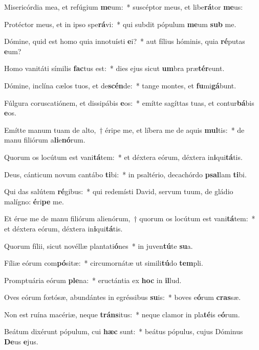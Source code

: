 \item Misericórdia mea, et refúgium \textbf{me}um:~* suscéptor meus, et libe\textbf{rá}tor \textbf{me}us:
\item Protéctor meus, et in ipso spe\textbf{rá}vi:~* qui subdit pópulum \textbf{me}um \textbf{sub} me.
\item Dómine, quid est homo quia innotuísti \textbf{e}i?~* aut fílius hóminis, quia \textbf{ré}putas \textbf{e}um?
\item Homo vanitáti símilis \textbf{fac}tus est:~* dies ejus sicut \textbf{um}bra præ\textbf{tér}eunt.
\item Dómine, inclína cælos tuos, et de\textbf{scén}de:~* tange montes, et \textbf{fu}mi\textbf{gá}bunt.
\item Fúlgura coruscatiónem, et dissipábis \textbf{e}os:~* emítte sagíttas tuas, et contur\textbf{bá}bis \textbf{e}os.
\item Emítte manum tuam de alto,~† éripe me, et líbera me de aquis \textbf{mul}tis:~* de manu filiórum a\textbf{li}e\textbf{nó}rum.
\item Quorum os locútum est vani\textbf{tá}tem:~* et déxtera eórum, déxtera in\textbf{i}qui\textbf{tá}tis.
\item Deus, cánticum novum cantábo \textbf{ti}bi:~* in psaltério, decachórdo \textbf{psal}lam \textbf{ti}bi.
\item Qui das salútem \textbf{ré}gibus:~* qui redemísti David, servum tuum, de gládio malígno: \textbf{é}ri\textbf{pe} me.
\item Et érue me de manu filiórum alienórum,~† quorum os locútum est vani\textbf{tá}tem:~* et déxtera eórum, déxtera in\textbf{i}qui\textbf{tá}tis.
\item Quorum fílii, sicut novéllæ plantati\textbf{ó}nes~* in juven\textbf{tú}te \textbf{su}a.
\item Fíliæ eórum com\textbf{pó}sitæ:~* circumornátæ ut simili\textbf{tú}do \textbf{tem}pli.
\item Promptuária eórum \textbf{ple}na:~* eructántia ex \textbf{hoc} in \textbf{il}lud.
\item Oves eórum fœtósæ, abundántes in egréssibus \textbf{su}is:~* boves e\textbf{ó}rum \textbf{cras}sæ.
\item Non est ruína macériæ, neque \textbf{tráns}itus:~* neque clamor in pla\textbf{té}is e\textbf{ó}rum.
\item Beátum dixérunt pópulum, cui \textbf{hæc} sunt:~* beátus pópulus, cujus Dóminus \textbf{De}us \textbf{e}jus.
